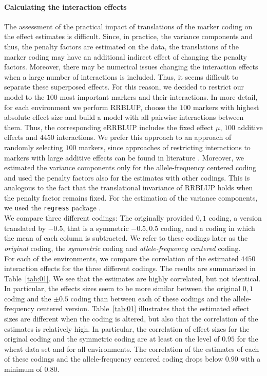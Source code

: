 \documentclass{bmcart}
\newcommand{\0}{\mathbf{0}}
\begin{document}
\paragraph{Calculating the interaction effects} 
The assessment of the practical impact of translations of the marker coding on the effect estimates is difficult. 
Since, in practice, the variance components and thus, the penalty factors are estimated on the data, the translations of the marker coding may have an additional indirect effect of changing the penalty factors. Moreover, there may be numerical issues changing the interaction effects when a large number of interactions is included.
Thus, it seems difficult to separate these superposed effects. For this reason, we decided to restrict our model to the $100$ most important markers and their interactions. In more detail, for each environment we perform RRBLUP, choose the $100$ markers with highest absolute effect size and build a model with all pairwise interactions between them. Thus, the corresponding eRRBLUP includes the fixed effect $\mu$, $100$ additive effects and $4450$ interactions. We prefer this approach to an approach of randomly selecting $100$ markers, since approaches of restricting interactions to markers with large additive effects can be found in literature \cite{karkkainen2015efficient}. Moreover, we estimated the variance components only for the allele-frequency centered coding and used the penalty factors also for the estimates with other codings. This is analogous to the fact that the translational invariance of RRBLUP holds when the penalty factor remains fixed. For the estimation of the variance components, we used the \texttt{regress} package \cite{clifford2014regress}.\\

We compare three different codings: The originally provided ${0,1}$ coding, a version translated by $-0.5$, that is a symmetric $-0.5, 0.5$ coding, and a coding in which the mean of each column is subtracted. We refer to these codings later as the \emph{original} coding, the \emph{symmetric} coding and \emph{allele-frequency centered} coding. \\

For each of the environments, we compare the correlation of the estimated $4450$ interaction effects for the three different codings. The results are summarized in Table~\ref{tab:01}. 
We see that the estimates are highly correlated, but not identical. In particular, the effects sizes seem to be more similar between the original $0,1$ coding and the $\pm 0.5$ coding than between each of these codings and the allele-frequency centered version.
Table~\ref{tab:01} illustrates that the estimated effect sizes are different when the coding is altered, but also that the correlation of the estimates is relatively high.
In particular, the correlation of effect sizes for the original coding and the symmetric coding are at least on the level of $0.95$ for the wheat data set and for all environments. 
The correlation of the estimates of each of these codings and the allele-frequency centered coding drops below $0.90$ with a minimum of $0.80$. 
\end{document}
